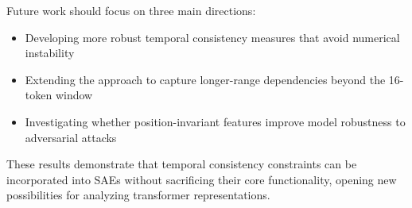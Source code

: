 \documentclass{article} %
\begin{document}
Future work should focus on three main directions:
\begin{itemize}
    \item Developing more robust temporal consistency measures that avoid numerical instability
    \item Extending the approach to capture longer-range dependencies beyond the 16-token window
    \item Investigating whether position-invariant features improve model robustness to adversarial attacks
\end{itemize}

These results demonstrate that temporal consistency constraints can be incorporated into SAEs without sacrificing their core functionality, opening new possibilities for analyzing transformer representations.



\end{document}
